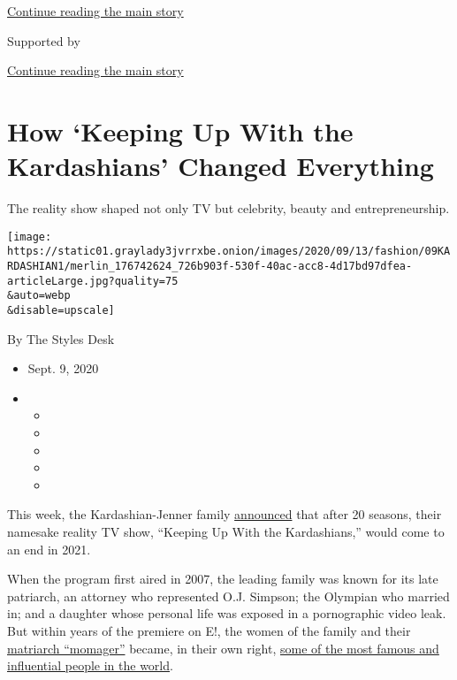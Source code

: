 \protect\hyperlink{after-top}{Continue reading the main story}

Supported by

\protect\hyperlink{after-sponsor}{Continue reading the main story}

\hypertarget{how-keeping-up-with-the-kardashians-changed-everything}{%
\section{How `Keeping Up With the Kardashians' Changed
Everything}\label{how-keeping-up-with-the-kardashians-changed-everything}}

The reality show shaped not only TV but celebrity, beauty and
entrepreneurship.

\texttt{[image: https://static01.graylady3jvrrxbe.onion/images/2020/09/13/fashion/09KARDASHIAN1/merlin\_176742624\_726b903f-530f-40ac-acc8-4d17bd97dfea-articleLarge.jpg?quality=75\\\&auto=webp\\\&disable=upscale]}

By The Styles Desk

\begin{itemize}
\item
  Sept. 9, 2020
\item
  \begin{itemize}
  \item
  \item
  \item
  \item
  \item
  \end{itemize}
\end{itemize}

This week, the Kardashian-Jenner family
\href{https://www.nytimes3xbfgragh.onion/2020/09/08/arts/television/kim-kardashian-keeping-up-with-the-kardashians.html}{announced}
that after 20 seasons, their namesake reality TV show, ``Keeping Up With
the Kardashians,'' would come to an end in 2021.

When the program first aired in 2007, the leading family was known for
its late patriarch, an attorney who represented O.J. Simpson; the
Olympian who married in; and a daughter whose personal life was exposed
in a pornographic video leak. But within years of the premiere on E!,
the women of the family and their
\href{https://www.nytimes3xbfgragh.onion/2015/05/10/magazine/where-would-the-kardashians-be-without-kris-jenner.html}{matriarch
``momager''} became, in their own right,
\href{https://www.nytimes3xbfgragh.onion/2019/03/30/style/kardashians-interview.html}{some
of the most famous and influential people in the world}.

